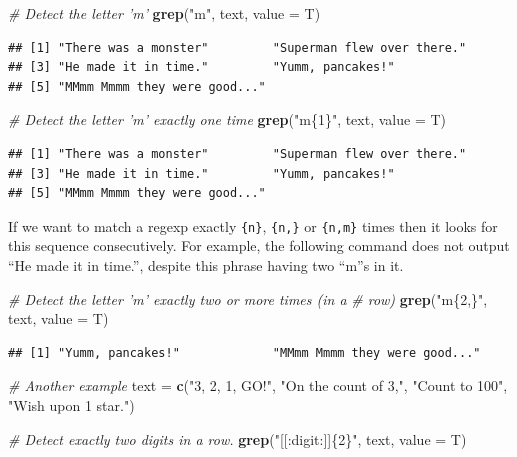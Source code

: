 \documentclass[
]{book}
\newenvironment{Shaded}{\begin{snugshade}}{\end{snugshade}}
\newcommand{\CommentTok}[1]{\textcolor[rgb]{0.56,0.35,0.01}{\textit{#1}}}
\newcommand{\DataTypeTok}[1]{\textcolor[rgb]{0.13,0.29,0.53}{#1}}
\newcommand{\KeywordTok}[1]{\textcolor[rgb]{0.13,0.29,0.53}{\textbf{#1}}}
\newcommand{\NormalTok}[1]{#1}
\newcommand{\StringTok}[1]{\textcolor[rgb]{0.31,0.60,0.02}{#1}}
\begin{document}
\begin{Shaded}
\begin{Highlighting}[]
\CommentTok{# Detect the letter 'm'}
\KeywordTok{grep}\NormalTok{(}\StringTok{"m"}\NormalTok{, text, }\DataTypeTok{value =}\NormalTok{ T)}
\end{Highlighting}
\end{Shaded}

\begin{verbatim}
## [1] "There was a monster"         "Superman flew over there."  
## [3] "He made it in time."         "Yumm, pancakes!"            
## [5] "MMmm Mmmm they were good..."
\end{verbatim}

\begin{Shaded}
\begin{Highlighting}[]
\CommentTok{# Detect the letter 'm' exactly one time}
\KeywordTok{grep}\NormalTok{(}\StringTok{"m\{1\}"}\NormalTok{, text, }\DataTypeTok{value =}\NormalTok{ T)}
\end{Highlighting}
\end{Shaded}

\begin{verbatim}
## [1] "There was a monster"         "Superman flew over there."  
## [3] "He made it in time."         "Yumm, pancakes!"            
## [5] "MMmm Mmmm they were good..."
\end{verbatim}

If we want to match a regexp exactly \texttt{\{n\}}, \texttt{\{n,\}} or \texttt{\{n,m\}} times then it looks for this sequence consecutively. For example, the following command does not output ``He made it in time.'', despite this phrase having two ``m''s in it.

\begin{Shaded}
\begin{Highlighting}[]
\CommentTok{# Detect the letter 'm' exactly two or more times (in a}
\CommentTok{# row)}
\KeywordTok{grep}\NormalTok{(}\StringTok{"m\{2,\}"}\NormalTok{, text, }\DataTypeTok{value =}\NormalTok{ T)}
\end{Highlighting}
\end{Shaded}

\begin{verbatim}
## [1] "Yumm, pancakes!"             "MMmm Mmmm they were good..."
\end{verbatim}

\begin{Shaded}
\begin{Highlighting}[]
\CommentTok{# Another example}
\NormalTok{text =}\StringTok{ }\KeywordTok{c}\NormalTok{(}\StringTok{"3, 2, 1, GO!"}\NormalTok{, }\StringTok{"On the count of 3,"}\NormalTok{, }\StringTok{"Count to 100"}\NormalTok{,}
    \StringTok{"Wish upon 1 star."}\NormalTok{)}

\CommentTok{# Detect exactly two digits in a row.}
\KeywordTok{grep}\NormalTok{(}\StringTok{"[[:digit:]]\{2\}"}\NormalTok{, text, }\DataTypeTok{value =}\NormalTok{ T)}
\end{Highlighting}
\end{Shaded}
\end{document}
